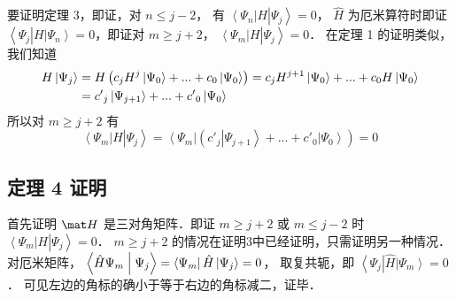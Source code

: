 要证明定理 3，即证，对 $n \leqslant j - 2$， 有 $\left\langle {{\Psi_n}} \right|H\left| {{\Psi_j}} \right\rangle  = 0$， $\hat H$ 为厄米算符时即证 $\left\langle {{\Psi_j}} \right|H\left| {{\Psi_n}} \right\rangle  = 0$，即证对 $m \geqslant j + 2$，  $\left\langle {{\Psi_m}} \right|H\left| {{\Psi_j}} \right\rangle  = 0$． 在定理 1 的证明类似，我们知道
\begin{equation}\begin{aligned}
  H\left| {{\Psi_j}} \right\rangle  &= H\left( {{c_j}{H^j}\left| {{\Psi_0}} \right\rangle  + ... + {c_0}\left| {{\Psi_0}} \right\rangle } \right) = {c_j}{H^{j + 1}}\left| {{\Psi_0}} \right\rangle  + ... + {c_0}H\left| {{\Psi_0}} \right\rangle \\
&= {{c'}_j}\left| {{\Psi_{j + 1}}} \right\rangle  + ... + {{c'}_0}\left| {{\Psi_0}} \right\rangle  \hfill \\ 
\end{aligned}\end{equation}
所以对 $m \geqslant j + 2$ 有
\begin{equation}
\left\langle {{\Psi_m}} \right|H\left| {{\Psi_j}} \right\rangle  = \left\langle {{\Psi_m}} \right|\left( {{{c'}_j}\left| {{\Psi_{j + 1}}} \right\rangle  + ... + {{c'}_0}\left| {{\Psi_0}} \right\rangle } \right) = 0
\end{equation}

\subsection{定理 4 证明}

首先证明 $\mat H$ 是三对角矩阵．即证 $m \geqslant j + 2$ 或 $m \leqslant j - 2$ 时 {$\left\langle {{\Psi_m}} \right|H\left| {{\Psi_j}} \right\rangle  = 0$．}
$m \geqslant j + 2$ 的情况在证明3中已经证明，只需证明另一种情况．
对厄米矩阵， $\left\langle {{\hat H{\Psi_m}}}
 \mathrel{\left | {\vphantom {{\hat H{\Psi_m}} {{\Psi_j}}}}
 \right. \kern-\nulldelimiterspace}
 {{{\Psi_j}}} \right\rangle  = \left\langle {{\Psi_m}} \right| \hat H\left| {{\Psi_j}} \right\rangle  = 0$， 取复共轭，即 $\left\langle {{\Psi_j}} \right|\hat H\left| {{\Psi_m}} \right\rangle  = 0$． 可见左边的角标的确小于等于右边的角标减二，证毕．

